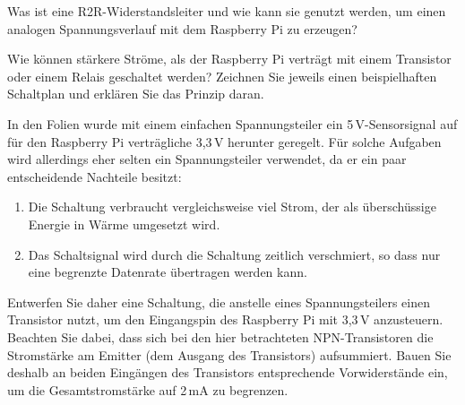 \bigskip
\teilaufgabe
Was ist eine R2R-Widerstandsleiter und wie kann sie genutzt werden, um einen
analogen Spannungsverlauf mit dem Raspberry Pi zu erzeugen?

\bigskip
\teilaufgabe
Wie können stärkere Ströme, als der Raspberry Pi verträgt mit einem Transistor
oder einem Relais geschaltet werden? Zeichnen Sie jeweils einen beispielhaften
Schaltplan und erklären Sie das Prinzip daran.

\bigskip
\teilaufgabe
In den Folien wurde mit einem einfachen Spannungsteiler ein 5\,V-Sensorsignal
auf für den Raspberry Pi verträgliche 3,3\,V herunter geregelt. Für solche
Aufgaben wird allerdings eher selten ein Spannungsteiler verwendet, da er ein
paar entscheidende Nachteile besitzt:

\begin{enumerate}
    \item Die Schaltung verbraucht vergleichsweise viel Strom, der als überschüssige
    Energie in Wärme umgesetzt wird.

    \item Das Schaltsignal wird durch die Schaltung zeitlich verschmiert, so dass
    nur eine begrenzte Datenrate übertragen werden kann.
\end{enumerate}

Entwerfen Sie daher eine Schaltung, die anstelle eines Spannungsteilers einen
Transistor nutzt, um den Eingangspin des Raspberry Pi mit 3,3\,V anzusteuern.
Beachten Sie dabei, dass sich bei den hier betrachteten NPN-Transistoren die
Stromstärke am Emitter (dem Ausgang des Transistors) aufsummiert. Bauen Sie
deshalb an beiden Eingängen des Transistors entsprechende Vorwiderstände ein,
um die Gesamtstromstärke auf 2\,mA zu begrenzen.



